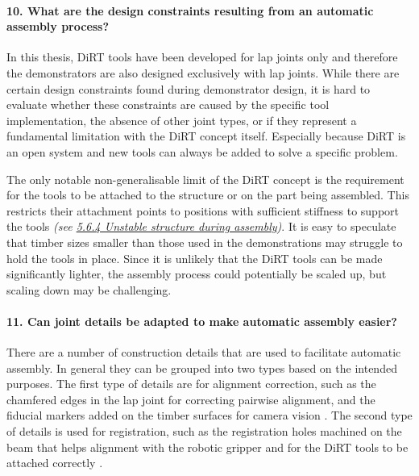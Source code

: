 \paragraph{10. What are the design constraints resulting from an automatic assembly process?}

In this thesis, DiRT tools have been developed for lap joints only and therefore the demonstrators are also designed exclusively with lap joints. While there are certain design constraints found during demonstrator design, it is hard to evaluate whether these constraints are caused by the specific tool implementation, the absence of other joint types, or if they represent a fundamental limitation with the DiRT concept itself. Especially because DiRT is an open system and new tools can always be added to solve a specific problem.

The only notable non-generalisable limit of the DiRT concept is the requirement for the tools to be attached to the structure or on the part being assembled. This restricts their attachment points to positions with sufficient stiffness to support the tools \textit{(see \ul{5.6.4 Unstable structure during assembly})}. It is easy to speculate that timber sizes smaller than those used in the demonstrations may struggle to hold the tools in place. Since it is unlikely that the DiRT tools can be made significantly lighter, the assembly process could potentially be scaled up, but scaling down may be challenging.

\paragraph{11. Can joint details be adapted to make automatic assembly easier?}

There are a number of construction details that are used to facilitate automatic assembly. In general they can be grouped into two types based on the intended purposes. The first type of details are for alignment correction, such as the chamfered edges in the lap joint for correcting pairwise alignment, and the fiducial markers added on the timber surfaces for camera vision . The second type of details is used for registration, such as the registration holes machined on the beam that helps alignment with the robotic gripper and for the DiRT tools to be attached correctly .

